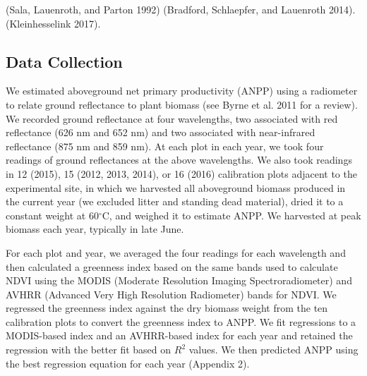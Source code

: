 \documentclass[fleqn,10pt,lineno]{wlpeerj} %
\begin{document}
 (Sala,
Lauenroth, and Parton 1992)
(Bradford, Schlaepfer, and Lauenroth 2014).
(Kleinhesselink 2017).

\hypertarget{data-collection}{%
\subsection{Data Collection}\label{data-collection}}

We estimated aboveground net primary productivity (ANPP) using a
radiometer to relate ground reflectance to plant biomass (see Byrne et
al. 2011 for a review). We recorded ground reflectance at four
wavelengths, two associated with red reflectance (626 nm and 652 nm) and
two associated with near-infrared reflectance (875 nm and 859 nm). At
each plot in each year, we took four readings of ground reflectances at
the above wavelengths. We also took readings in 12 (2015), 15 (2012,
2013, 2014), or 16 (2016) calibration plots adjacent to the experimental
site, in which we harvested all aboveground biomass produced in the
current year (we excluded litter and standing dead material), dried it
to a constant weight at 60\(^{\circ}\)C, and weighed it to estimate
ANPP. We harvested at peak biomass each year, typically in late June.

For each plot and year, we averaged the four readings for each
wavelength and then calculated a greenness index based on the same bands
used to calculate NDVI using the MODIS (Moderate Resolution Imaging
Spectroradiometer) and AVHRR (Advanced Very High Resolution Radiometer)
bands for NDVI. We regressed the greenness index against the dry biomass
weight from the ten calibration plots to convert the greenness index to
ANPP. We fit regressions to a MODIS-based index and an AVHRR-based index
for each year and retained the regression with the better fit based on
\(R^2\) values. We then predicted ANPP using the best regression
equation for each year (Appendix 2).
\end{document}
